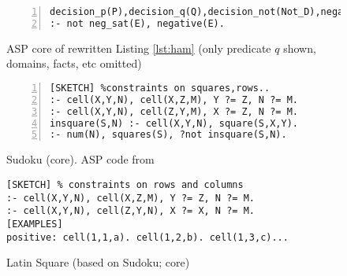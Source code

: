 \begin{figure*}[htb]
\begin{subfigure}[t]{0.66\textwidth}
\begin{Verbatim}[fontsize=\scriptsize,numbers=left,xleftmargin=6mm,commandchars=\\\{\}]
       decision_p(P),decision_q(Q),decision_not(Not_D),negative(E). \label{line:negative_rewritten2}
:- not neg_sat(E), negative(E).
\end{Verbatim}
\caption{ASP core of rewritten Listing \protect \ref{lst:ham} (only predicate $q$ shown, domains, facts, etc omitted)} \label{lst:rewriting}
\end{subfigure}
\hrulesep
\begin{subfigure}[t]{0.49\textwidth}
  \renewcommand{\figurename}{Sketch}
  \vspace{2pt}
\begin{Verbatim}[fontsize=\scriptsize,numbers=left,xleftmargin=0mm]
[SKETCH] %constraints on squares,rows..
:- cell(X,Y,N), cell(X,Z,M), Y ?= Z, N ?= M.
:- cell(X,Y,N), cell(Z,Y,M), X ?= Z, N ?= M.
insquare(S,N) :- cell(X,Y,N), square(S,X,Y).
:- num(N), squares(S), ?not insquare(S,N). 
\end{Verbatim}
\caption{Sudoku (core). \protect ASP code from \cite{asp_tutorial_sudoku}} \label{lst:sudoku}
\end{subfigure} 
\begin{subfigure}[t]{0.44\textwidth}
  \vspace{2pt}
  \renewcommand{\figurename}{Listing}
\begin{Verbatim}[fontsize=\scriptsize]
[SKETCH] % constraints on rows and columns
:- cell(X,Y,N), cell(X,Z,M), Y ?= Z, N ?= M.
:- cell(X,Y,N), cell(Z,Y,N), X ?= X, N ?= M.
[EXAMPLES]
positive: cell(1,1,a). cell(1,2,b). cell(1,3,c)...
\end{Verbatim}
\caption{Latin Square (based on Sudoku; core)} \label{lst:latin_square}
\end{subfigure}

\caption{Collection of sketches and an example of rewriting used in the paper}
\label{fig:table_with_sketches}
\end{figure*}
